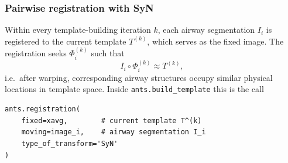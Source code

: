 \subsubsection{Pairwise registration with SyN}
\label{sec:syn}                  %



Within every template-building iteration $k$, each airway segmentation $I_i$ is
registered to the current template $T^{(k)}$, which serves as the fixed image.
The registration seeks $\Phi_i^{(k)}$ such that
\begin{equation}
  I_i \circ \Phi_i^{(k)} \approx T^{(k)},
  \label{eq:registration_goal}   %
\end{equation}
i.e.\ after warping, corresponding airway structures occupy similar physical
locations in template space. Inside \texttt{ants.build\_template} this is the call

\begin{lstlisting}
ants.registration(
    fixed=xavg,        # current template T^(k)
    moving=image_i,    # airway segmentation I_i
    type_of_transform='SyN'
)
\end{lstlisting}


